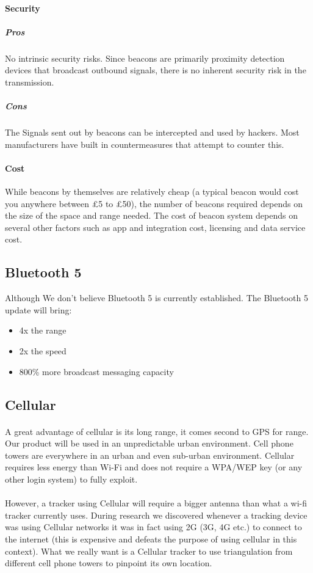 \documentclass[12pt,a4paper]{article}
\begin{document}
\begin{appendices}
          \paragraph{Security}
            \subparagraph{Pros}
              No intrinsic security risks. Since beacons are primarily proximity detection devices that broadcast outbound signals, there is no inherent security risk in the transmission.
            \subparagraph{Cons}
              The Signals sent out by beacons can be intercepted and used by hackers. Most manufacturers have built in countermeasures that attempt to counter this.
          \paragraph{Cost}
            While beacons by themselves are relatively cheap (a typical beacon would cost you anywhere between £5 to £50), the number of beacons required depends on the size of the space and range needed. The cost of beacon system depends on several other factors such as app and integration cost, licensing and data service cost. 
    
    \subsection{Bluetooth 5}
      Although We don’t believe Bluetooth 5 is currently established. The Bluetooth 5 update will bring:
      \begin{itemize}
      \item 4x the range
      \item 2x the speed
      \item 800\% more broadcast messaging capacity
      \end{itemize}
    
    \subsection{Cellular}
      \paragraph{}
      A great advantage of cellular is its long range, it comes second to GPS for range. Our product will be used in an unpredictable urban environment. Cell phone towers are everywhere in an urban and even sub-urban environment. Cellular requires less energy than Wi-Fi and does not require a WPA/WEP key (or any other login system) to fully exploit.
      \paragraph{}
      However, a tracker using Cellular will require a bigger antenna than what a wi-fi tracker currently uses. During research we discovered whenever a tracking device was using Cellular networks it was in fact using 2G (3G, 4G etc.) to connect to the internet (this is expensive and defeats the purpose of using cellular in this context). What we really want is a Cellular tracker to use triangulation from different cell phone towers to pinpoint its own location.

\end{appendices}
\end{document}
